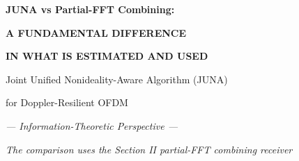 \documentclass[aspectratio=169,10pt]{beamer}
\begin{document}
\begin{frame}[plain]
  \vspace{1.3cm}
  \begin{center}
    {\bfseries\Huge JUNA vs Partial-FFT Combining:\par}
    \vspace{0.45em}
    {\bfseries\LARGE A FUNDAMENTAL DIFFERENCE\par}
    \vspace{0.30em}
    {\bfseries\LARGE IN WHAT IS ESTIMATED AND USED\par}

    \vspace{0.9cm}

    \vspace{0.7cm}
    {\Large Joint Unified Nonideality-Aware Algorithm (JUNA)\par}
    \vspace{0.15em}
    {\Large for Doppler-Resilient OFDM\par}

    \vspace{0.8cm}
    {\itshape\large\color{inkgray}--- Information-Theoretic Perspective ---\par}
    \vspace{0.25em}
    {\itshape\normalsize\color{inkgray}
      The comparison uses the Section II partial-FFT combining receiver\par}
  \end{center}
\end{frame}
\end{document}
